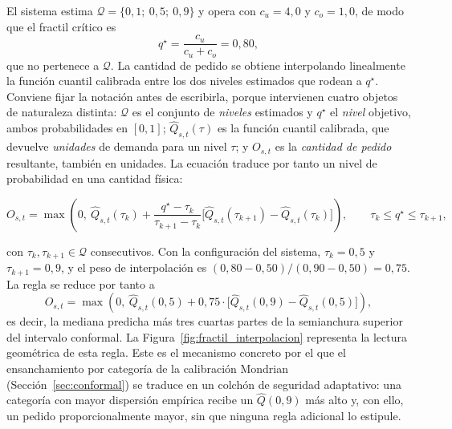 El sistema estima $\mathcal{Q} = \{0{,}1;\ 0{,}5;\ 0{,}9\}$ y opera con $c_u = 4{,}0$ y $c_o = 1{,}0$, de modo que el fractil crítico es
\begin{equation}
    q^\star = \frac{c_u}{c_u + c_o} = 0{,}80,
\end{equation}
que no pertenece a $\mathcal{Q}$. La cantidad de pedido se obtiene interpolando linealmente la función cuantil calibrada entre los dos niveles estimados que rodean a $q^\star$. Conviene fijar la notación antes de escribirla, porque intervienen cuatro objetos de naturaleza distinta: $\mathcal{Q}$ es el conjunto de \emph{niveles} estimados y $q^\star$ el \emph{nivel} objetivo, ambos probabilidades en $[0,1]$; $\hat{Q}_{s,t}(\tau)$ es la función cuantil calibrada, que devuelve \emph{unidades} de demanda para un nivel $\tau$; y $O_{s,t}$ es la \emph{cantidad de pedido} resultante, también en unidades. La ecuación traduce por tanto un nivel de probabilidad en una cantidad física:

\begin{equation}
\label{eq:order_quantity}
    O_{s,t} = \max\!\left(0,\ \hat{Q}_{s,t}(\tau_k) + \frac{q^\star - \tau_k}{\tau_{k+1} - \tau_k}\Big[\hat{Q}_{s,t}(\tau_{k+1}) - \hat{Q}_{s,t}(\tau_k)\Big]\right),
    \qquad \tau_k \leq q^\star \leq \tau_{k+1},
\end{equation}

con $\tau_k, \tau_{k+1} \in \mathcal{Q}$ consecutivos. Con la configuración del sistema, $\tau_k = 0{,}5$ y $\tau_{k+1} = 0{,}9$, y el peso de interpolación es $(0{,}80 - 0{,}50)/(0{,}90 - 0{,}50) = 0{,}75$. La regla se reduce por tanto a
\begin{equation}
    O_{s,t} = \max\!\left(0,\ \hat{Q}_{s,t}(0{,}5) + 0{,}75 \cdot \big[\hat{Q}_{s,t}(0{,}9) - \hat{Q}_{s,t}(0{,}5)\big]\right),
\end{equation}
es decir, la mediana predicha más tres cuartas partes de la semianchura superior del intervalo conformal. La Figura~\ref{fig:fractil_interpolacion} representa la lectura geométrica de esta regla. Este es el mecanismo concreto por el que el ensanchamiento por categoría de la calibración Mondrian (Sección~\ref{sec:conformal}) se traduce en un colchón de seguridad adaptativo: una categoría con mayor dispersión empírica recibe un $\hat{Q}(0{,}9)$ más alto y, con ello, un pedido proporcionalmente mayor, sin que ninguna regla adicional lo estipule.

